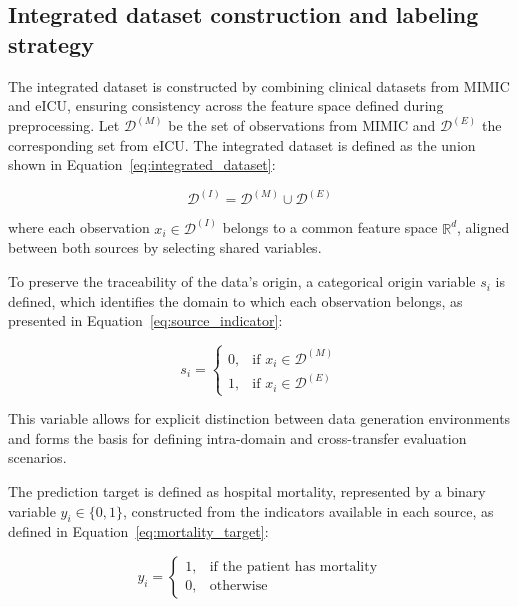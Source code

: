 \documentclass[utf8]{FrontiersinHarvard} %
\begin{document}
\subsection{Integrated dataset construction and labeling strategy}
The integrated dataset is constructed by combining clinical datasets from MIMIC and eICU, ensuring consistency across the feature space defined during preprocessing. Let $\mathcal{D}^{(M)}$ be the set of observations from MIMIC and $\mathcal{D}^{(E)}$ the corresponding set from eICU. The integrated dataset is defined as the union shown in Equation~\ref{eq:integrated_dataset}:

\begin{equation}
	\mathcal{D}^{(I)} = \mathcal{D}^{(M)} \cup \mathcal{D}^{(E)}
	\label{eq:integrated_dataset}
\end{equation}

where each observation $x_i \in \mathcal{D}^{(I)}$ belongs to a common feature space $\mathbb{R}^d$, aligned between both sources by selecting shared variables.

To preserve the traceability of the data's origin, a categorical origin variable $s_i$ is defined, which identifies the domain to which each observation belongs, as presented in Equation~\ref{eq:source_indicator}:

\begin{equation}
	s_i =
	\begin{cases}
		0, & \text{if } x_i \in \mathcal{D}^{(M)} \\
		1, & \text{if } x_i \in \mathcal{D}^{(E)}
	\end{cases}
	\label{eq:source_indicator}
\end{equation}

This variable allows for explicit distinction between data generation environments and forms the basis for defining intra-domain and cross-transfer evaluation scenarios.

The prediction target is defined as hospital mortality, represented by a binary variable $y_i \in \{0,1\}$, constructed from the indicators available in each source, as defined in Equation~\ref{eq:mortality_target}:

\begin{equation}
	y_i =
	\begin{cases}
		1, & \text{if the patient has mortality} \\
		0, & \text{otherwise}
	\end{cases}
	\label{eq:mortality_target}
\end{equation}
\end{document}
